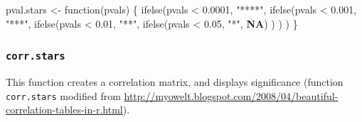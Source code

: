 \documentclass[
  bookmarksnumbered]{article}
\newenvironment{Shaded}{\begin{snugshade}}{\end{snugshade}}
\newcommand{\ConstantTok}[1]{\textcolor[rgb]{0.86,0.64,0.64}{\textbf{#1}}}
\newcommand{\ControlFlowTok}[1]{\textcolor[rgb]{0.94,0.87,0.69}{#1}}
\newcommand{\FloatTok}[1]{\textcolor[rgb]{0.75,0.75,0.82}{#1}}
\newcommand{\FunctionTok}[1]{\textcolor[rgb]{0.94,0.94,0.56}{#1}}
\newcommand{\NormalTok}[1]{\textcolor[rgb]{0.80,0.80,0.80}{#1}}
\newcommand{\OtherTok}[1]{\textcolor[rgb]{0.94,0.94,0.56}{#1}}
\newcommand{\SpecialCharTok}[1]{\textcolor[rgb]{0.86,0.64,0.64}{#1}}
\newcommand{\StringTok}[1]{\textcolor[rgb]{0.80,0.58,0.58}{#1}}
\begin{document}
\begin{Shaded}
\begin{Highlighting}[]
\NormalTok{pval.stars }\OtherTok{\textless{}{-}} \ControlFlowTok{function}\NormalTok{(pvals) \{}
  \FunctionTok{ifelse}\NormalTok{(pvals }\SpecialCharTok{\textless{}} \FloatTok{0.0001}\NormalTok{, }\StringTok{"****"}\NormalTok{,}
    \FunctionTok{ifelse}\NormalTok{(pvals }\SpecialCharTok{\textless{}} \FloatTok{0.001}\NormalTok{, }\StringTok{"***"}\NormalTok{,}
      \FunctionTok{ifelse}\NormalTok{(pvals }\SpecialCharTok{\textless{}} \FloatTok{0.01}\NormalTok{, }\StringTok{"**"}\NormalTok{,}
        \FunctionTok{ifelse}\NormalTok{(pvals }\SpecialCharTok{\textless{}} \FloatTok{0.05}\NormalTok{, }\StringTok{"*"}\NormalTok{, }\ConstantTok{NA}\NormalTok{)}
\NormalTok{      )}
\NormalTok{    )}
\NormalTok{  )}
\NormalTok{\}}
\end{Highlighting}
\end{Shaded}

\subsubsection{\texorpdfstring{\texttt{corr.stars}}{corr.stars}}\label{corr.stars}

This function creates a correlation matrix, and displays significance (function \texttt{corr.stars} modified from \url{http://myowelt.blogspot.com/2008/04/beautiful-correlation-tables-in-r.html}).
\end{document}
